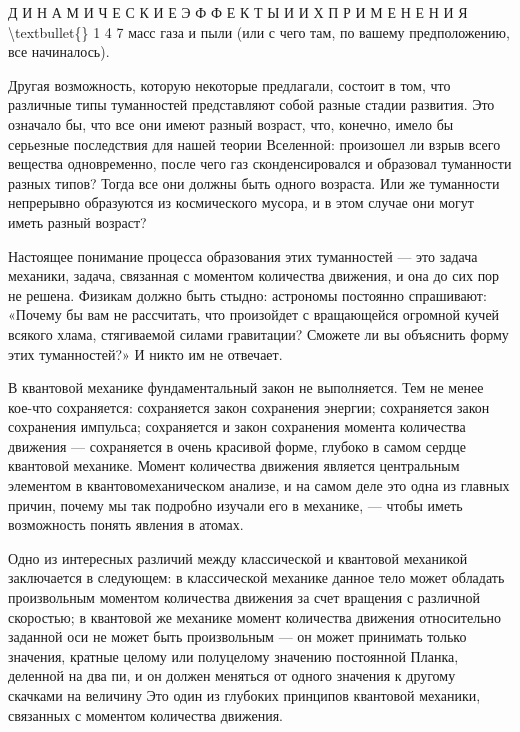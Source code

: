 \documentclass[10pt,oneside]{article}
\newcommand{\TipsSubsection}[1]{\par\vspace{6bp}{\normalsize\bfseries #1\par}\vspace{2bp}}
\begin{document}
Д И Н А М И Ч Е С К И Е  Э Ф Ф Е К Т Ы  И  И Х  П Р И М Е Н Е Н И Я \textbackslash{}textbullet\{\} 1 4 7 масс газа и пыли (или с чего там, по вашему предположению, все начиналось).\par

Другая возможность, которую некоторые предлагали, состоит в том, что различные типы туманностей представляют собой разные стадии развития. Это означало бы, что все они имеют разный возраст, что, конечно, имело бы серьезные последствия для нашей теории Вселенной: произошел ли взрыв всего вещества одновременно, после чего газ сконденсировался и образовал туманности разных типов? Тогда все они должны быть одного возраста. Или же туманности непрерывно образуются из космического мусора, и в этом случае они могут иметь разный возраст?\par

Настоящее понимание процесса образования этих туманностей --- это задача механики, задача, связанная с моментом количества движения, и она до сих пор не решена. Физикам должно быть стыдно: астрономы постоянно спрашивают: «Почему бы вам не рассчитать, что произойдет с вращающейся огромной кучей всякого хлама, стягиваемой силами гравитации? Сможете ли вы объяснить форму этих туманностей?» И никто им не отвечает.\par

\TipsSubsection{4-13 Момент количества движения в квантовой механике}

В квантовой механике фундаментальный закон не выполняется. Тем не менее кое-что сохраняется: сохраняется закон сохранения энергии; сохраняется закон сохранения импульса; сохраняется и закон сохранения момента количества движения --- сохраняется в очень красивой форме, глубоко в самом сердце квантовой механике. Момент количества движения является центральным элементом в квантовомеханическом анализе, и на самом деле это одна из главных причин, почему мы так подробно изучали его в механике, --- чтобы иметь возможность понять явления в атомах.\par

Одно из интересных различий между классической и квантовой механикой заключается в следующем: в классической механике данное тело может обладать произвольным моментом количества движения за счет вращения с различной скоростью; в квантовой же механике момент количества движения относительно заданной оси не может быть произвольным --- он может принимать только значения, кратные целому или полуцелому значению постоянной Планка, деленной на два пи, и он должен меняться от одного значения к другому скачками на величину Это один из глубоких принципов квантовой механики, связанных с моментом количества движения.\par
\end{document}
